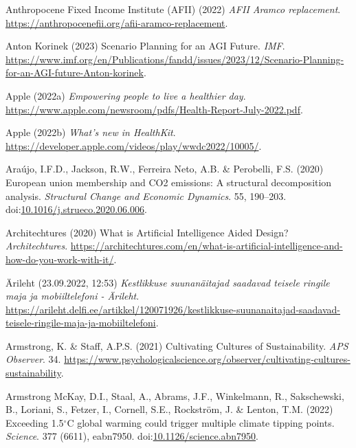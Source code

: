 \documentclass[
  letterpaper,
  DIV=11,
  numbers=noendperiod]{scrartcl}
\newlength{\cslhangindent}
\newenvironment{CSLReferences}[2] %
 {\begin{list}{}{%
  \setlength{\itemindent}{0pt}
  \setlength{\leftmargin}{0pt}
  \setlength{\parsep}{0pt}
  \ifodd #1
   \setlength{\leftmargin}{\cslhangindent}
   \setlength{\itemindent}{-1\cslhangindent}
  \fi
  \setlength{\itemsep}{#2\baselineskip}}}
 {\end{list}}
\begin{document}
\begin{CSLReferences}{0}{1}
Anthropocene Fixed Income Institute (AFII) (2022) \emph{{AFII Aramco}
replacement}. \url{https://anthropocenefii.org/afii-aramco-replacement}.

Anton Korinek (2023) Scenario {Planning} for an {AGI Future}.
\emph{IMF}.
\url{https://www.imf.org/en/Publications/fandd/issues/2023/12/Scenario-Planning-for-an-AGI-future-Anton-korinek}.

Apple (2022a) \emph{Empowering people to live a healthier day}.
\url{https://www.apple.com/newsroom/pdfs/Health-Report-July-2022.pdf}.

Apple (2022b) \emph{What's new in {HealthKit}}.
\url{https://developer.apple.com/videos/play/wwdc2022/10005/}.

Araújo, I.F.D., Jackson, R.W., Ferreira Neto, A.B. \& Perobelli, F.S.
(2020) European union membership and {CO2} emissions: {A} structural
decomposition analysis. \emph{Structural Change and Economic Dynamics}.
55, 190--203.
doi:\href{https://doi.org/10.1016/j.strueco.2020.06.006}{10.1016/j.strueco.2020.06.006}.

Architechtures (2020) What is {Artificial Intelligence Aided Design}?
\emph{Architechtures}.
\url{https://architechtures.com/en/what-is-artificial-intelligence-and-how-do-you-work-with-it/}.

Ärileht (23.09.2022, 12:53) \emph{Kestlikkuse suunan{ä}itajad saadavad
teisele ringile maja ja mobiiltelefoni - {{Ä}rileht}}.
\url{https://arileht.delfi.ee/artikkel/120071926/kestlikkuse-suunanaitajad-saadavad-teisele-ringile-maja-ja-mobiiltelefoni}.

Armstrong, K. \& Staff, A.P.S. (2021) Cultivating {Cultures} of
{Sustainability}. \emph{APS Observer}. 34.
\url{https://www.psychologicalscience.org/observer/cultivating-cultures-sustainability}.

Armstrong McKay, D.I., Staal, A., Abrams, J.F., Winkelmann, R.,
Sakschewski, B., Loriani, S., Fetzer, I., Cornell, S.E., Rockström, J.
\& Lenton, T.M. (2022) Exceeding 1.5{\(^\circ\)}{C} global warming could
trigger multiple climate tipping points. \emph{Science}. 377 (6611),
eabn7950.
doi:\href{https://doi.org/10.1126/science.abn7950}{10.1126/science.abn7950}.


\end{CSLReferences}
\end{document}
